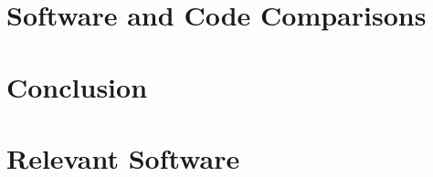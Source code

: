 \documentclass[12pt,twoside]{report}
\begin{document}
\chapter{Software and Code Comparisons}
\label{chap:software-and-code}





\chapter{Conclusion}
\label{chap:conclusion}

{}


{}
\appendix
\chapter{Relevant Software}

% 
% 
% 
% 
\end{document}
